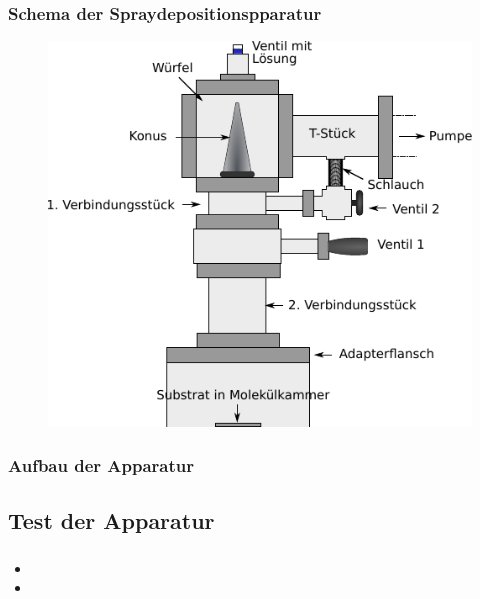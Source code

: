 \documentclass{beamer}
\begin{document}
\begin{frame}
\frametitle{Schema der Spraydepositionspparatur}
\begin{figure}[H]
\centering
\includegraphics{bilder/wuerfelklein.pdf}
\end{figure}
\end{frame}


\begin{frame}
\frametitle{Aufbau der Apparatur}
\begin{figure}[H]
\centering

\end{figure}
\end{frame}



\subsection[Ergebnisse]{Test der Apparatur}

\begin{frame}
\frametitle{}
\begin{itemize}
  \item
  \item
\end{itemize}
\end{frame}
\end{document}
